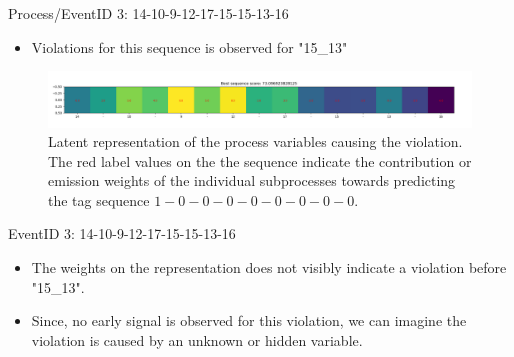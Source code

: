 \documentclass{beamer}
\begin{document}
\begin{frame} %
\begin{block}{Process/EventID 3: 14-10-9-12-17-15-15-13-16}
		\begin{itemize}
                \scriptsize
				\item Violations for this sequence is observed for "15\_13"
			\end{itemize}
\end{block}
\begin{figure}[!h]
            \includegraphics[scale = .23]{item_three.png}
            \centering
            \caption{\scriptsize Latent representation of the process variables causing the violation.  The red label values on the the sequence indicate the contribution or emission weights of the individual subprocesses towards predicting the tag sequence $1-0-0-0-0-0-0-0-0$.}
            \label{fig3}
\end{figure}
\begin{block}{EventID 3: 14-10-9-12-17-15-15-13-16}
		\begin{itemize}
            \scriptsize
			\item The weights on the representation does not visibly indicate a violation before "15\_13".
            \item Since, no early signal is observed for this violation, we can imagine the violation is caused by an unknown or hidden variable. 
			\end{itemize}
\end{block}
\end{frame}
\end{document}
